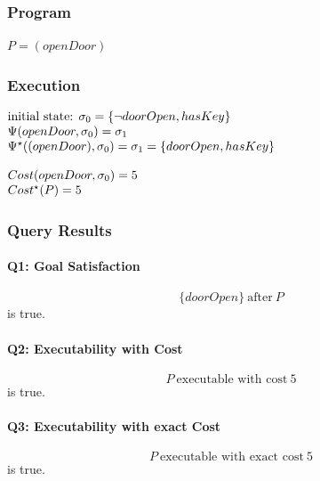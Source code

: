 \documentclass[11pt]{article}
\makeatletter
\newenvironment{centeredleftblock}[1][0.78\textwidth]
{\begin{center}\begin{minipage}{#1}\raggedright}
{\end{minipage}\end{center}}
\newenvironment{statementblock}
{\begin{flushleft}\renewcommand{\arraystretch}{1.1}\(\begin{array}{@{}l@{}}}
{\end{array}\)\end{flushleft}}
\makeatother
\begin{document}
\subsubsection*{Program}
\begin{centeredleftblock}[0.45\textwidth]
\(
P = (openDoor)
\)
\end{centeredleftblock}

\subsubsection*{Execution}

\begin{centeredleftblock}[0.9\textwidth]
\noindent
\begin{minipage}[t]{0.64\linewidth}
\begin{statementblock}
\text{initial state: } \sigma_0 = \{\neg doorOpen, hasKey\} \\
\Psi(openDoor, \sigma_0) = \sigma_1 \\
\Psi^\star((openDoor), \sigma_0) = \sigma_1 = \{doorOpen, hasKey\}
\end{statementblock}
\end{minipage}
\hfill
\begin{minipage}[t]{0.28\linewidth}
\begin{statementblock}
Cost(openDoor, \sigma_0) = 5 \\
Cost^\star(P) = 5
\end{statementblock}
\end{minipage}
\end{centeredleftblock}


\subsubsection{Query Results}

\paragraph{Q1: Goal Satisfaction}
\[
\{doorOpen\} ~\text{after}~ P
\]
is true.

\paragraph{Q2: Executability with Cost}
\[
P ~\text{executable with cost}~ 5
\]
is true.

\paragraph{Q3: Executability with exact Cost}
\[
P ~\text{executable with exact cost}~ 5
\]
is true.
\end{document}
